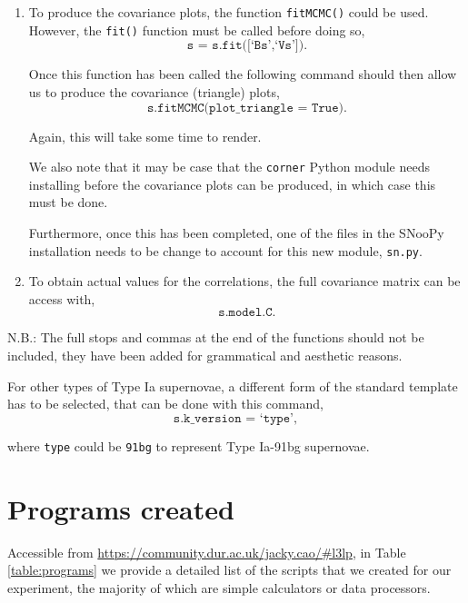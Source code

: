 \documentclass[twocolumn]{revtex4}
\begin{document}
{{{{{\begin{enumerate}
 It is worth noting that as this is a more complex method, it is sampling multiple probabilities, it will take more time to render a final plot. 
 
 \item To produce the covariance plots, the function \texttt{fitMCMC()} could be used. However, the \texttt{fit()} function must be called before doing so,
 \begin{equation*}
 \texttt{s = s.fit([`Bs',`Vs'])} . 
 \end{equation*}
 
 Once this function has been called the following command should then allow us to produce the covariance (triangle) plots,
 \begin{equation*}
 \texttt{s.fitMCMC(plot\_triangle = True)} . 
 \end{equation*}
 
 Again, this will take some time to render. 
 
 We also note that it may be case that the \texttt{corner} Python module needs installing before the covariance plots can be produced, in which case this must be done. 
 
 Furthermore, once this has been completed, one of the files in the SNooPy installation needs to be change to account for this new module, \texttt{sn.py}.
 
 \item To obtain actual values for the correlations, the full covariance matrix can be access with, 
 \begin{equation*}
 \texttt{s.model.C}.
 \end{equation*}
\end{enumerate}

N.B.: The full stops and commas at the end of the functions should not be included, they have been added for grammatical and aesthetic reasons.

For other types of Type Ia supernovae, a different form of the standard template has to be selected, that can be done with this command,
\begin{equation*}
\texttt{s.k\_version = `type'},
\end{equation*}

where \texttt{type} could be \texttt{91bg} to represent Type Ia-91bg supernovae.

\clearpage

\onecolumngrid
\vspace{-3ex}
\section{Programs created}
\vspace{-2ex}
Accessible from \url{https://community.dur.ac.uk/jacky.cao/#l3lp}, in Table \ref{table:programs} we provide a detailed list of the scripts that we created for our experiment, the majority of which are simple calculators or data processors.

}}}}}
\end{document}
